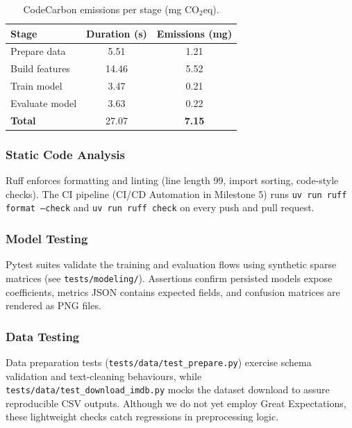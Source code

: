 \documentclass[11pt,a4paper]{article}
\begin{document}
\begin{table}[H]
  \centering
  \caption{CodeCarbon emissions per stage (mg CO\(_2\)eq).}
  \label{tab:carbon}
  \begin{tabular}{lcc}
    \toprule
    Stage & Duration (s) & Emissions (mg) \\
    \midrule
    Prepare data & 5.51 & 1.21 \\
    Build features & 14.46 & 5.52 \\
    Train model & 3.47 & 0.21 \\
    Evaluate model & 3.63 & 0.22 \\
    \midrule
    \textbf{Total} & 27.07 & \textbf{7.15} \\
    \bottomrule
  \end{tabular}
\end{table}

\subsubsection{Static Code Analysis}
Ruff enforces formatting and linting (line length 99, import sorting, code-style checks). The CI pipeline (CI/CD Automation in Milestone 5) runs \texttt{uv run ruff format --check} and \texttt{uv run ruff check} on every push and pull request.

\subsubsection{Model Testing}
Pytest suites validate the training and evaluation flows using synthetic sparse matrices (see \texttt{tests/modeling/}). Assertions confirm persisted models expose coefficients, metrics JSON contains expected fields, and confusion matrices are rendered as PNG files.

\subsubsection{Data Testing}
Data preparation tests (\texttt{tests/data/test\_prepare.py}) exercise schema validation and text-cleaning behaviours, while \texttt{tests/data/test\_download\_imdb.py} mocks the dataset download to assure reproducible CSV outputs. Although we do not yet employ Great Expectations, these lightweight checks catch regressions in preprocessing logic.
\end{document}
